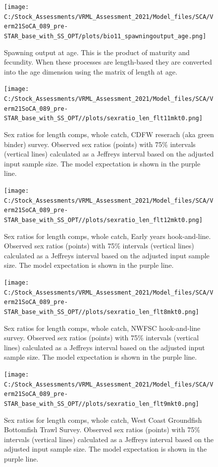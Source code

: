 \documentclass[11pt,
  english,
  a4paper,
]{article}
\begin{document}
\begin{figure}
\centering
\texttt{[image: C:/Stock\_Assessments/VRML\_Assessment\_2021/Model\_files/SCA/Verm21SoCA\_089\_pre-STAR\_base\_with\_SS\_OPT/plots/bio11\_spawningoutput\_age.png]}
\caption{Spawning output at age. This is the product of maturity and fecundity. When these processes are length-based they are converted into the age dimension using the matrix of length at age.\label{fig:spawnage}}
\end{figure}

\FloatBarrier

\begin{figure}
\centering
\texttt{[image: C:/Stock\_Assessments/VRML\_Assessment\_2021/Model\_files/SCA/Verm21SoCA\_089\_pre-STAR\_base\_with\_SS\_OPT//plots/sexratio\_len\_flt11mkt0.png]}
\caption{Sex ratios for length comps, whole catch, CDFW reserach (aka green binder) survey. Observed sex ratios (points) with 75\% intervals (vertical lines) calculated as a Jeffreys interval based on the adjusted input sample size. The model expectation is shown in the purple line.\label{fig:sexratio-CDFW-RESEARCH}}
\end{figure}

\begin{figure}
\centering
\texttt{[image: C:/Stock\_Assessments/VRML\_Assessment\_2021/Model\_files/SCA/Verm21SoCA\_089\_pre-STAR\_base\_with\_SS\_OPT//plots/sexratio\_len\_flt12mkt0.png]}
\caption{Sex ratios for length comps, whole catch, Early years hook-and-line. Observed sex ratios (points) with 75\% intervals (vertical lines) calculated as a Jeffreys interval based on the adjusted input sample size. The model expectation is shown in the purple line.\label{fig:sexratio-EARLY-HKL}}
\end{figure}

\begin{figure}
\centering
\texttt{[image: C:/Stock\_Assessments/VRML\_Assessment\_2021/Model\_files/SCA/Verm21SoCA\_089\_pre-STAR\_base\_with\_SS\_OPT//plots/sexratio\_len\_flt8mkt0.png]}
\caption{Sex ratios for length comps, whole catch, NWFSC hook-and-line survey. Observed sex ratios (points) with 75\% intervals (vertical lines) calculated as a Jeffreys interval based on the adjusted input sample size. The model expectation is shown in the purple line.\label{fig:sexratio-NWFSC-HKL}}
\end{figure}

\begin{figure}
\centering
\texttt{[image: C:/Stock\_Assessments/VRML\_Assessment\_2021/Model\_files/SCA/Verm21SoCA\_089\_pre-STAR\_base\_with\_SS\_OPT//plots/sexratio\_len\_flt9mkt0.png]}
\caption{Sex ratios for length comps, whole catch, West Coast Groundfish Bottomfish Trawl Survey. Observed sex ratios (points) with 75\% intervals (vertical lines) calculated as a Jeffreys interval based on the adjusted input sample size. The model expectation is shown in the purple line.\label{fig:sexratio-NWFSC-TWL}}
\end{figure}
\end{document}
